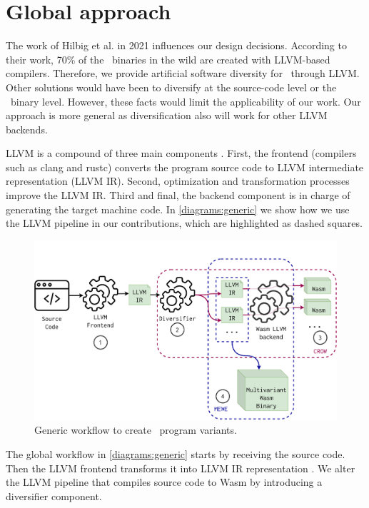 \section{Global approach}
\label{tech:generic}


The work of Hilbig et al. \cite{Hilbig2021AnES} in 2021 influences our design decisions. According to their work, 70\% of the \wasm\ binaries in the wild are created with LLVM-based compilers. Therefore, we provide artificial software diversity for \wasm\ through LLVM. 
Other solutions would have been to diversify at the source-code level or the \wasm\ binary level. However, these facts would limit the applicability of our work.
Our approach is more general as diversification also will work for other LLVM backends.

LLVM is a compound of three main components \cite{llvmofficialweb}. First, the frontend (compilers such as clang and rustc) converts the program source code to LLVM intermediate representation (LLVM IR). Second, optimization and transformation processes improve the LLVM IR. Third and final, the backend component is in charge of generating the target machine code. In \autoref{diagrams:generic} we show how we use the LLVM pipeline in our contributions, which are highlighted as dashed squares.

\begin{figure}[h]
    \includegraphics[width=\linewidth]{diagrams/architecture.pdf}
    \caption{Generic workflow to create \wasm\ program variants.}
    \label{diagrams:generic}
\end{figure}



The global workflow in \autoref{diagrams:generic} starts by receiving the source code. Then the LLVM frontend transforms it into LLVM IR representation . 
We alter the LLVM pipeline that compiles source code to Wasm by introducing a diversifier component.  

